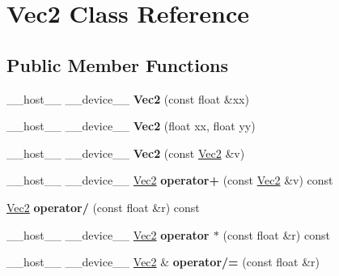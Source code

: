 \hypertarget{class_vec2}{}\section{Vec2 Class Reference}
\label{class_vec2}
\subsection*{Public Member Functions}
\begin{DoxyCompactItemize}
\item 
\+\_\+\+\_\+host\+\_\+\+\_\+ \+\_\+\+\_\+device\+\_\+\+\_\+ {\bfseries Vec2} (const float \&xx)\hypertarget{class_vec2_a33d3d56000bb864e5d30eb48f1685695}{}\label{class_vec2_a33d3d56000bb864e5d30eb48f1685695}

\item 
\+\_\+\+\_\+host\+\_\+\+\_\+ \+\_\+\+\_\+device\+\_\+\+\_\+ {\bfseries Vec2} (float xx, float yy)\hypertarget{class_vec2_aa39cf936ef3699647eb72ef76f6ce97d}{}\label{class_vec2_aa39cf936ef3699647eb72ef76f6ce97d}

\item 
\+\_\+\+\_\+host\+\_\+\+\_\+ \+\_\+\+\_\+device\+\_\+\+\_\+ {\bfseries Vec2} (const \hyperlink{class_vec2}{Vec2} \&v)\hypertarget{class_vec2_a0dfcf0539532615ae5b37a4d2995253d}{}\label{class_vec2_a0dfcf0539532615ae5b37a4d2995253d}

\item 
\+\_\+\+\_\+host\+\_\+\+\_\+ \+\_\+\+\_\+device\+\_\+\+\_\+ \hyperlink{class_vec2}{Vec2} {\bfseries operator+} (const \hyperlink{class_vec2}{Vec2} \&v) const\hypertarget{class_vec2_a71daf354e7f2dc8acd0f4ccb33e2d77b}{}\label{class_vec2_a71daf354e7f2dc8acd0f4ccb33e2d77b}

\item 
\hyperlink{class_vec2}{Vec2} {\bfseries operator/} (const float \&r) const\hypertarget{class_vec2_a71b95a0b8cb412cf5d7fc52b53dc8e47}{}\label{class_vec2_a71b95a0b8cb412cf5d7fc52b53dc8e47}

\item 
\+\_\+\+\_\+host\+\_\+\+\_\+ \+\_\+\+\_\+device\+\_\+\+\_\+ \hyperlink{class_vec2}{Vec2} {\bfseries operator $\ast$} (const float \&r) const\hypertarget{class_vec2_a3eae44cc4053ef70be638d4d4202fe72}{}\label{class_vec2_a3eae44cc4053ef70be638d4d4202fe72}

\item 
\+\_\+\+\_\+host\+\_\+\+\_\+ \+\_\+\+\_\+device\+\_\+\+\_\+ \hyperlink{class_vec2}{Vec2} \& {\bfseries operator/=} (const float \&r)\hypertarget{class_vec2_a622c47d2f678a364b2cc6d09a453cfd6}{}\label{class_vec2_a622c47d2f678a364b2cc6d09a453cfd6}


\end{DoxyCompactItemize}
